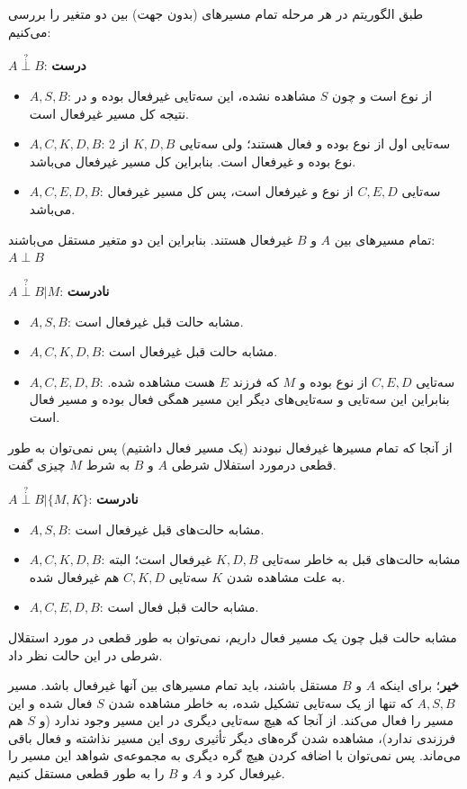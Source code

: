 \question{}

طبق الگوریتم  در هر مرحله تمام مسیرهای (بدون جهت) بین دو متغیر را بررسی می‌کنیم:
\begin{ابجد}
\item $A \overset{?}{\perp} B$: \textbf{درست}
\begin{itemize}
    \item $A,S,B$: از نوع  است و چون $S$ مشاهده نشده، این سه‌تایی غیرفعال بوده و در نتیجه کل مسیر غیرفعال است.
    \item $A,C,K,D,B$: 2 سه‌تایی اول از نوع  بوده و فعال هستند؛ ولی سه‌تایی $K,D,B$ از نوع  بوده و غیرفعال است. بنابراین کل مسیر غیرفعال می‌باشد.
    \item $A,C,E,D,B$: سه‌تایی $C,E,D$ از نوع  و غیرفعال است، پس کل مسیر غیرفعال می‌باشد.
\end{itemize}
تمام مسیرهای بین $A$ و $B$ غیرفعال هستند. بنابراین این دو متغیر مستقل می‌باشند: $A \perp B$

\item $A \overset{?}{\perp} B | M$: \textbf{نادرست}
\begin{itemize}
    \item $A,S,B$: مشابه حالت قبل غیرفعال است.
    \item $A,C,K,D,B$: مشابه حالت قبل غیرفعال است.
    \item $A,C,E,D,B$: سه‌تایی $C,E,D$ از نوع  بوده و $M$ که فرزند $E$ هست مشاهده شده. بنابراین این سه‌تایی و سه‌تایی‌های دیگر این مسیر همگی فعال بوده و مسیر فعال است.
\end{itemize}
از آنجا که تمام مسیرها غیرفعال نبودند (یک مسیر فعال داشتیم) پس نمی‌توان به طور قطعی درمورد استفلال شرطی $A$ و $B$ به شرط $M$ چیزی گفت.

\item $A \overset{?}{\perp} B | \{M,K\}$: \textbf{نادرست}
\begin{itemize}
    \item $A,S,B$: مشابه حالت‌های قبل غیرفعال است.
    \item $A,C,K,D,B$: مشابه حالت‌های قبل به خاطر سه‌تایی $K,D,B$ غیرفعال است؛ البته به علت مشاهده شدن $K$ سه‌تایی $C,K,D$ هم غیرفعال شده.
    \item $A,C,E,D,B$: مشابه حالت قبل فعال است.
\end{itemize}
مشابه حالت قبل چون یک مسیر فعال داریم، نمی‌توان به طور قطعی در مورد استقلال شرطی در این حالت نظر داد.

\item \textbf{خیر}؛ برای اینکه $A$ و $B$ مستقل باشند، باید تمام مسیرهای بین آنها غیرفعال باشد. مسیر $A,S,B$ که تنها از یک سه‌تایی  تشکیل شده، به خاطر مشاهده شدن $S$ فعال شده و این مسیر را فعال می‌کند. از آنجا که هیچ سه‌تایی دیگری در این مسیر وجود ندارد (و $S$ هم فرزندی ندارد)، مشاهده شدن گره‌های دیگر تأثیری روی این مسیر نذاشته و فعال باقی می‌ماند. پس نمی‌توان با اضافه کردن هیچ گره دیگری به مجموعه‌ی شواهد این مسیر را غیرفعال کرد و $A$ و $B$ را به طور قطعی مستقل کنیم.

\end{ابجد}